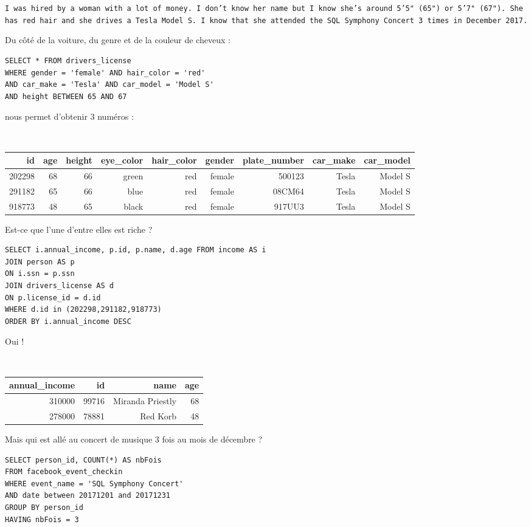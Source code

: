 {\tt I was hired by a woman with a lot of money. I don't know her name but I know she's around 5'5" (65") or 5'7" (67"). She has red hair and she drives a Tesla Model S. I know that she attended the SQL Symphony Concert 3 times in December 2017.}


Du côté de la voiture, du genre et de la couleur de cheveux :
\begin{verbatim}
SELECT * FROM drivers_license
WHERE gender = 'female' AND hair_color = 'red' 
AND car_make = 'Tesla' AND car_model = 'Model S' 
AND height BETWEEN 65 AND 67 
\end{verbatim}
nous permet d'obtenir 3 numéros :

\begin{table}[!htp]
\centering
{\tt
\begin{tabular}{rrrrrrrrr}
id& age& height& eye\_color& hair\_color& gender& plate\_number& car\_make& car\_model \\ \hline
202298& 68& 66& green& red& female& 500123& Tesla& Model S \\
291182& 65& 66& blue& red& female& 08CM64& Tesla& Model S \\
918773& 48& 65& black& red& female& 917UU3& Tesla& Model S \\
\end{tabular}
}
\end{table}

Est-ce que l'une d'entre elles est riche ?
\begin{verbatim}
SELECT i.annual_income, p.id, p.name, d.age FROM income AS i
JOIN person AS p 
ON i.ssn = p.ssn
JOIN drivers_license AS d
ON p.license_id = d.id
WHERE d.id in (202298,291182,918773)
ORDER BY i.annual_income DESC
\end{verbatim}
Oui !

\begin{table}[!htp]
\centering
{\tt
\begin{tabular}{rrrr}
annual\_income	&id&	name&	age \\ \hline
310000	&99716&	Miranda Priestly	&68\\
278000	&78881	&Red Korb&	48\\
\end{tabular}
}
\end{table}

Mais qui est allé au concert de musique 3 fois au mois de décembre ?

\begin{verbatim}
SELECT person_id, COUNT(*) AS nbFois
FROM facebook_event_checkin
WHERE event_name = 'SQL Symphony Concert'
AND date between 20171201 and 20171231
GROUP BY person_id
HAVING nbFois = 3 
\end{verbatim}

